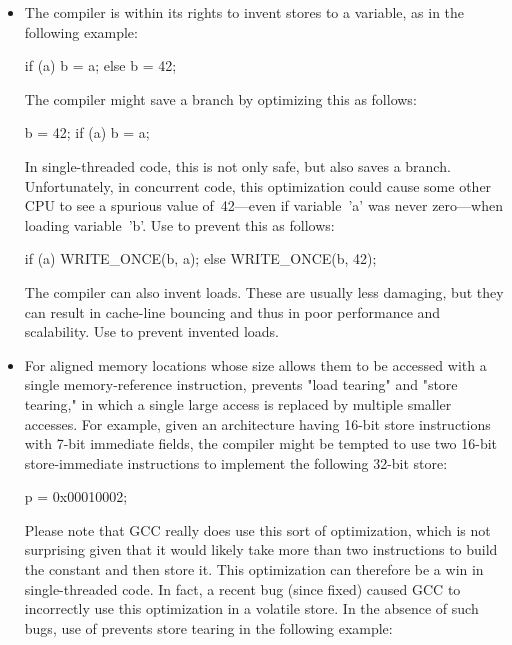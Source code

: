 \begin{itemize}
 \item
     The compiler is within its rights to invent stores to a variable,
     as in the following example:

\begin{VerbatimU}
	if (a)
		b = a;
	else
		b = 42;
\end{VerbatimU}

     The compiler might save a branch by optimizing this as follows:

\begin{VerbatimU}
	b = 42;
	if (a)
		b = a;
\end{VerbatimU}

     In single-threaded code, this is not only safe, but also saves
     a branch.
     Unfortunately, in concurrent code, this optimization could cause
     some other CPU to see a spurious value of~42---even if variable~'a'
     was never zero---when loading variable~'b'.
     Use  to prevent this as follows:

\begin{VerbatimU}
	if (a)
		WRITE_ONCE(b, a);
	else
		WRITE_ONCE(b, 42);
\end{VerbatimU}

     The compiler can also invent loads.
     These are usually less damaging, but they can result in cache-line
     bouncing and thus in poor performance and scalability.
     Use  to prevent invented loads.

 \item
     For aligned memory locations whose size allows them to be accessed
     with a single memory-reference instruction, prevents "load tearing"
     and "store tearing," in which a single large access is replaced by
     multiple smaller accesses.
     For example, given an architecture having 16-bit store instructions
     with 7-bit immediate fields, the compiler might be tempted to use
     two 16-bit store-immediate instructions to implement the following
     32-bit store:

\begin{VerbatimU}
	p = 0x00010002;
\end{VerbatimU}

     Please note that GCC really does use this sort of optimization,
     which is not surprising given that it would likely take more
     than two instructions to build the constant and then store it.
     This optimization can therefore be a win in single-threaded code.
     In fact, a recent bug (since fixed) caused GCC to incorrectly use
     this optimization in a volatile store.
     In the absence of such bugs, use of  prevents
     store tearing in the following example:


\end{itemize}
